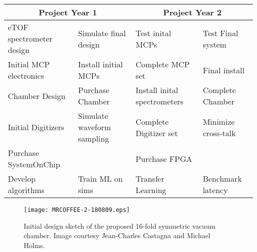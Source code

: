 \small
\begin{tabular}{l|l|l|l}
\hline
\multicolumn{2}{c|}{Project Year 1} &  \multicolumn{2}{c}{Project Year 2} \\
\hline
eTOF spectrometer design & Simulate final design & Test inital MCPs & Test Final system\\
Initial MCP electronics & Install initial MCPs & Complete MCP set & Final install\\
Chamber Design & Purchase Chamber& Install inital spectrometers & Complete Chamber\\
Initial Digitizers & Simulate waveform sampling& Complete Digitizer set & Minimize cross-talk\\
\hline
Purchase SystemOnChip & & Purchase FPGA &\\
Develop algorithms& Train ML on sims & Transfer Learning & Benchmark latency\\
\hline
\end{tabular}
\normalsize

\begin{wrapfigure}[18]{r}{3in}
\vspace{-.75\baselineskip}
\centerline{\texttt{[image: MRCOFFEE-2-180809.eps]}}
\vspace{-.25\baselineskip}
\caption{\label{fig::mrcoffee} Initial design sketch of the proposed 16-fold symmetric vacuum chamber. Image courtesy Jean-Charles Castagna and Michael Holms.}
\end{wrapfigure}
